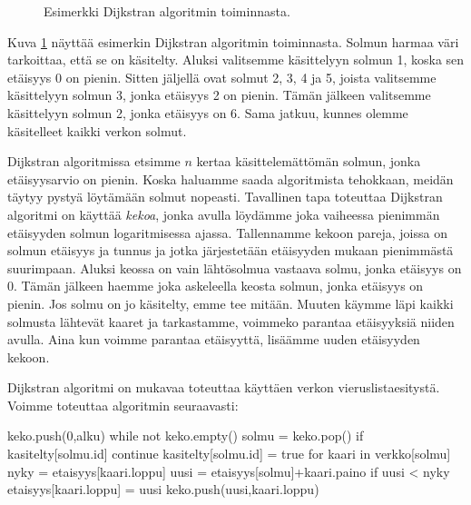 \begin{figure}
\begin{center}
\end{center}
\caption{Esimerkki Dijkstran algoritmin toiminnasta.}
\label{fig:dijalg}
\end{figure}

Kuva \ref{fig:dijalg} näyttää esimerkin Dijkstran algoritmin
toiminnasta.
Solmun harmaa väri tarkoittaa, että se on käsitelty.
Aluksi valitsemme käsittelyyn solmun 1, koska sen etäisyys 0 on pienin.
Sitten jäljellä ovat solmut 2, 3, 4 ja 5,
joista valitsemme käsittelyyn solmun 3, jonka etäisyys 2 on pienin.
Tämän jälkeen valitsemme käsittelyyn solmun 2,
jonka etäisyys on 6.
Sama jatkuu, kunnes olemme käsitelleet kaikki verkon solmut.

Dijkstran algoritmissa etsimme $n$ kertaa
käsittelemättömän solmun, jonka etäisyysarvio on pienin.
Koska haluamme saada algoritmista tehokkaan,
meidän täytyy pystyä löytämään solmut nopeasti.
Tavallinen tapa toteuttaa Dijkstran algoritmi on käyttää \emph{kekoa},
jonka avulla löydämme joka vaiheessa pienimmän etäisyyden solmun
logaritmisessa ajassa.
Tallennamme kekoon pareja, joissa on solmun etäisyys ja tunnus
ja jotka järjestetään etäisyyden mukaan pienimmästä suurimpaan.
Aluksi keossa on vain lähtösolmua vastaava solmu,
jonka etäisyys on $0$.
Tämän jälkeen haemme joka askeleella keosta solmun,
jonka etäisyys on pienin.
Jos solmu on jo käsitelty, emme tee mitään.
Muuten käymme läpi kaikki solmusta lähtevät kaaret
ja tarkastamme, voimmeko parantaa etäisyyksiä
niiden avulla.
Aina kun voimme parantaa etäisyyttä,
lisäämme uuden etäisyyden kekoon.

Dijkstran algoritmi on mukavaa toteuttaa käyttäen
verkon vieruslistaesitystä.
Voimme toteuttaa algoritmin seuraavasti:

\begin{code}
keko.push({0,alku})
while not keko.empty()
    solmu = keko.pop()
    if kasitelty[solmu.id]
        continue
    kasitelty[solmu.id] = true
    for kaari in verkko[solmu]
        nyky = etaisyys[kaari.loppu]
        uusi = etaisyys[solmu]+kaari.paino
        if uusi < nyky
            etaisyys[kaari.loppu] = uusi
            keko.push({uusi,kaari.loppu})
\end{code}

